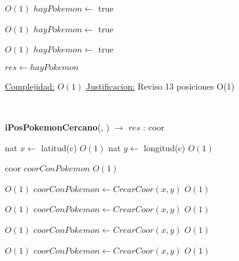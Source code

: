 \begin{Algoritmos}
\begin{algorithmic}[1]
             \Comment $O(1)$
            \State $hayPokemon \gets$ true
        \EndIf
    \EndIf

             \Comment $O(1)$
            \State $hayPokemon \gets$ true
        \EndIf

    \EndIf
\EndIf

         \Comment $O(1)$
        \State $hayPokemon \gets$ true
    \EndIf
\EndIf

\State $res \gets hayPokemon$

\medskip
\State \underline{Complejidad:} $O(1)$ %
\State \underline{Justificacion:} Reviso 13 posiciones O(1)

\end{algorithmic}

$ $\newline
$ $\newline
$ $\newline



{\textbf{iPosPokemonCercano}(, ) $\to$ $res$ : coor}
\begin{algorithmic}[1]

\State nat $x \gets$ latitud(c)    \Comment $O(1)$
\State nat $y \gets$ longitud(c)   \Comment $O(1)$


\State coor $coorConPokemon$    \Comment $O(1)$

     \Comment $O(1)$
    \State $coorConPokemon \gets CrearCoor(x, y)$    \Comment $O(1)$
\EndIf

         \Comment $O(1)$
        \State $coorConPokemon \gets CrearCoor(x, y)$    \Comment $O(1)$
    \EndIf


             \Comment $O(1)$
            \State $coorConPokemon \gets CrearCoor(x, y)$    \Comment $O(1)$
        \EndIf

    \EndIf

             \Comment $O(1)$
            \State $coorConPokemon \gets CrearCoor(x, y)$    \Comment $O(1)$
        \EndIf
    \EndIf


\end{algorithmic}
\end{Algoritmos}
